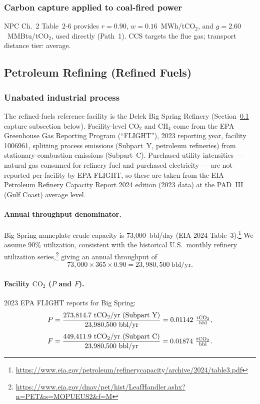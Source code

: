 \documentclass[11pt]{article}
\newcommand{\cotwo}{\ensuremath{\mathrm{CO_2}}}
\newcommand{\chfour}{\ensuremath{\mathrm{CH_4}}}
\begin{document}
\subsubsection{Carbon capture applied to coal-fired power}

NPC Ch.~2 Table~2-6 provides $r = 0.90$, $w = 0.16$~MWh/t\cotwo{}, and $g = 2.60$~MMBtu/t\cotwo{}, used directly (Path~1). CCS targets the flue gas; transport distance tier: average.

\subsection{Petroleum Refining (Refined Fuels)}
\label{sec:const_refining}

\subsubsection{Unabated industrial process}

The refined-fuels reference facility is the Delek Big Spring Refinery (Section~\ref{sec:const_refining} capture subsection below). Facility-level \cotwo{} and \chfour{} come from the EPA Greenhouse Gas Reporting Program (``FLIGHT''), 2023 reporting year, facility 1006961, splitting process emissions (Subpart~Y, petroleum refineries) from stationary-combustion emissions (Subpart~C). Purchased-utility intensities --- natural gas consumed for refinery fuel and purchased electricity --- are not reported per-facility by EPA FLIGHT, so these are taken from the EIA Petroleum Refinery Capacity Report 2024 edition (2023 data) at the PAD~III (Gulf Coast) average level.

\paragraph{Annual throughput denominator.} Big Spring nameplate crude capacity is 73{,}000~bbl/day (EIA 2024 Table~3).\footnote{\url{https://www.eia.gov/petroleum/refinerycapacity/archive/2024/table3.pdf}} We assume 90\% utilization, consistent with the historical U.S.\ monthly refinery utilization series,\footnote{\url{https://www.eia.gov/dnav/pet/hist/LeafHandler.ashx?n=PET&s=MOPUEUS2&f=M}} giving an annual throughput of
%
\[
  73{,}000 \times 365 \times 0.90 = 23{,}980{,}500~\text{bbl/yr}.
\]

\paragraph{Facility \cotwo{} ($P$ and $F$).} 2023 EPA FLIGHT reports for Big Spring:
%
\begin{align*}
  P &= \frac{273{,}814.7~\text{t\cotwo{}/yr (Subpart Y)}}{23{,}980{,}500~\text{bbl/yr}} = 0.01142~\tfrac{\text{t\cotwo{}}}{\text{bbl}}, \\[3pt]
  F &= \frac{449{,}411.9~\text{t\cotwo{}/yr (Subpart C)}}{23{,}980{,}500~\text{bbl/yr}} = 0.01874~\tfrac{\text{t\cotwo{}}}{\text{bbl}}.
\end{align*}
\end{document}
